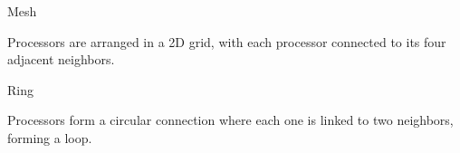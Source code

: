 \documentclass[a4paper, 10pt]{book}
\begin{document}
\begin{minipage}{0.4925\linewidth}
\begin{tcolorbox}[colframe=black!50, colback=white, size=small]
                            {\bold Mesh}
                            
                            Processors are arranged in a 2D grid, with each processor connected to its four adjacent neighbors.

                            \begin{center}
                            \end{center}

                        \end{tcolorbox} %

                        \begin{tcolorbox}[colframe=black!50, colback=white, size=small]
                            
                            {\bold Ring}
                            
                            Processors form a circular connection where each one is linked to two neighbors, forming a loop.

                            \begin{center}
                                \begin{tikzpicture}


\end{tikzpicture}
\end{center}
\end{tcolorbox}
\end{minipage}
\end{document}
